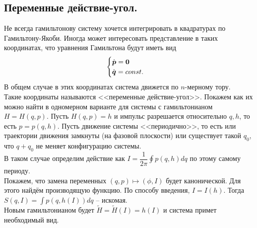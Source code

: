 \subsection{Переменные действие-угол.}
Не всегда гамильтонову систему хочется интегрировать в квадратурах по Гамильтону-Якоби.
Иногда может интересовать представление в таких координатах, что уравнения Гамильтона будут иметь вид
\[
    \begin{cases}
        \dot{\boldsymbol{p}} = \boldsymbol{0} \\
        \dot{\boldsymbol{q}} = const.
    \end{cases}
\]
В общем случае в этих координатах система движется по $n$-мерному тору. \\
Такие координаты называются <<переменные действие-угол>>.
Покажем как их можно найти в одномерном варианте для системы с гамильтонианом $H = H(q, p)$.
Пусть $H(q, p) = h$ и импульс разрешается относительно $q, h$, то есть $p = p(q, h)$.
Пусть движение системы <<периодично>>, то есть или траектории движения замкнуты (на фазовой плоскости) или существует такой $q_0$, что $q + q_0$ не меняет конфигурацию системы. \\
В таком случае определим действие как $I = \dfrac{1}{2\pi}\oint p(q, h)dq$ по этому самому периоду. \\
Покажем, что замена переменных $(q, p) \mapsto (\phi, I)$ будет канонической.
Для этого найдём производящую функцию. По способу введения, $I = I(h)$.
Тогда $S(q, I) = \int p(q, h(I))dq$ -- искомая. \\
Новым гамильтонианом будет $\tilde{H} = \tilde{H}(I) = h(I)$ и система примет необходимый вид.

